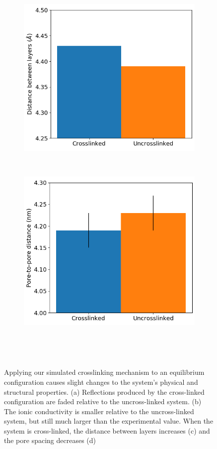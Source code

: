 \documentclass[journal=jpcbfk,manusciprt=article]{achemso}
\begin{document}
\begin{figure}
\begin{subfigure}{0.45\textwidth}
	\includegraphics[width=\textwidth]{dbwl_xlink.png}
	\caption{}~\label{fig:dbwl_xlink}
  \end{subfigure}
  \begin{subfigure}{0.45\textwidth}
	\centering
	\includegraphics[width=\textwidth]{p2p_xlink.png}
	\caption{}~\label{fig:p2p_xlink}
  \end{subfigure}
  \caption{Applying our simulated crosslinking mechanism to an equilibrium
	  configuration causes slight changes to the system's physical and structural
	  properties. (a) Reflections produced by the cross-linked configuration are
	  faded relative to the uncross-linked system. (b) The ionic conductivity is
	  smaller relative to the uncross-linked system, but still much larger than the
	  experimental value. When the system is cross-linked, the distance between
	  layers increases (c) and the pore spacing decreases (d)}~\label{fig:xlink}
  \end{figure}
 
\end{document}
